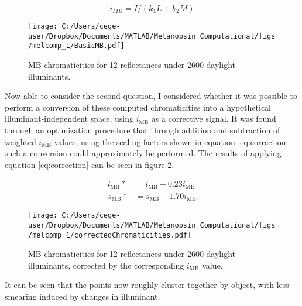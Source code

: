 \documentclass{article}
\begin{document}
\begin{equation} \label{eq:i}
i_{MB} = I/(k_1L + k_2M) 
\end{equation}

\begin{figure}[h]
    \centering
    \texttt{[image: C:/Users/cege-user/Dropbox/Documents/MATLAB/Melanopsin\_Computational/figs/melcomp\_1/BasicMB.pdf]}
    \caption{\ac{MB} chromaticities for 12 reflectances under 2600 daylight illuminants.}
    \label{fig:mb}
\end{figure} 

Now able to consider the second question, I considered whether it was possible to perform a conversion of these computed chromaticities into a hypothetical illuminant-independent space, using $i_{\text{MB}}$ as a corrective signal. It was found through an optimization procedure that through addition and subtraction of weighted $i_{\text{MB}}$ values, using the scaling factors shown in equation \ref{eq:correction} such a conversion could approximately be performed. The results of applying equation \ref{eq:correction} can be seen in figure \ref{fig:corrected}.

\begin{subequations} \label{eq:correction}
\begin{align}
l_{\text{MB}}* &= l_{\text{MB}} + 0.23i_{\text{MB}}\\
s_{\text{MB}}* &= s_{\text{MB}} - 1.70i_{\text{MB}}
\end{align}
\end{subequations}

\begin{figure}[h]
    \centering
    \texttt{[image: C:/Users/cege-user/Dropbox/Documents/MATLAB/Melanopsin\_Computational/figs/melcomp\_1/correctedChromaticities.pdf]}
    \caption{\ac{MB} chromaticities for 12 reflectances under 2600 daylight illuminants, corrected by the corresponding $i_{\text{MB}}$ value.}
    \label{fig:corrected}
\end{figure} 

It can be seen that the points now roughly cluster together by object, with less smearing induced by changes in illuminant.
\end{document}
